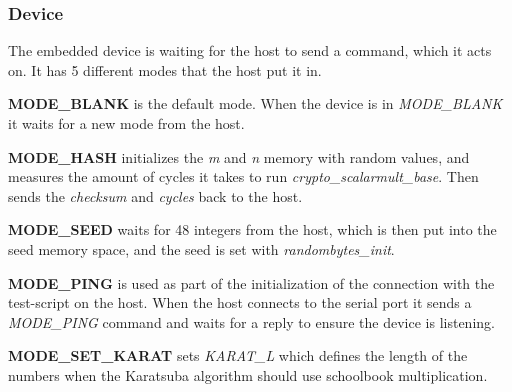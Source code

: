 \subsubsection{Device}
The embedded device is waiting for the host to send a command, which it acts on. It has 5 different modes that the host put it in.

\medskip
\textbf{MODE\_BLANK} is the default mode. When the device is in \textit{MODE\_BLANK} it waits for a new mode from the host.

\medskip
\textbf{MODE\_HASH} initializes the \textit{m} and \textit{n} memory with random values, and measures the amount of cycles it takes to run \textit{crypto\_scalarmult\_base}. Then sends the \textit{checksum} and \textit{cycles} back to the host.

\medskip
\textbf{MODE\_SEED} waits for 48 integers from the host, which is then put into the seed memory space, and the seed is set with \textit{randombytes\_init}.

\medskip
\textbf{MODE\_PING} is used as part of the initialization of the connection with the test-script on the host. When the host connects to the serial port it sends a \textit{MODE\_PING} command and waits for a reply to ensure the device is listening.

\medskip
\textbf{MODE\_SET\_KARAT} sets \textit{KARAT\_L} which defines the length of the numbers when the Karatsuba algorithm should use schoolbook multiplication.

\medskip
